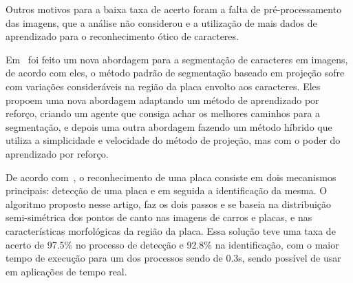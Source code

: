 Outros motivos para a baixa taxa de acerto foram a falta de pré-processamento
das imagens, que a análise não considerou e a utilização de mais dados de
aprendizado para o reconhecimento ótico de caracteres.

Em~\cite{abtahi2015deep} foi feito um nova abordagem para a segmentação de
caracteres em imagens, de acordo com eles, o método padrão de segmentação
baseado em projeção sofre com variações consideráveis na região da placa envolto
aos caracteres. Eles propoem uma nova abordagem adaptando um método de
aprendizado por reforço, criando um agente que consiga achar os melhores
caminhos para a segmentação, e depois uma outra abordagem fazendo um método
híbrido que utiliza a simplicidade e velocidade do método de projeção, mas com o
poder do aprendizado por reforço.

De acordo com~\cite{wafy2016efficient}, o reconhecimento de uma placa consiste
em dois mecanismos principais: detecção de uma placa e em seguida a
identificação da mesma. O algoritmo proposto nesse artigo, faz os dois passos e
se baseia na distribuição semi-simétrica dos pontos de canto nas imagens de
carros e placas, e nas características morfológicas da região da placa. Essa
solução teve uma taxa de acerto de 97.5\% no processo de detecção e 92.8\% na
identificação, com o maior tempo de execução para um dos processos sendo de
0.3s, sendo possível de usar em aplicações de tempo real.
